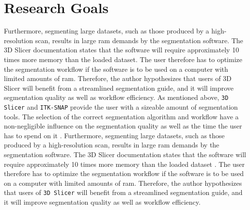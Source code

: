 \section{Research Goals}\label{s:introduction-researchgoals}
Furthermore, segmenting large datasets, such as those produced by a high-resolution \mct\space scan, results in large \acrfull{ram} demands by the segmentation software.
The 3D Slicer documentation states that the software will require approximately 10 times more memory than the loaded dataset.
The user therefore has to optimize the segmentation workflow if the software is to be used on a computer with limited amounts of \acrshort{ram}.
Therefore, the author hypothesizes that users of 3D Slicer will benefit from a streamlined segmentation guide, and it will improve segmentation quality as well as workflow efficiency.
As mentioned above, \texttt{3D Slicer} and \texttt{ITK-SNAP} provide the user with a sizeable amount of segmentation tools. The selection of the correct segmentation algorithm and workflow have a non-negligible influence on the segmentation quality as well as the time the user has to spend on it \cite{liuSAMMSegmentAny2023}.
Furthermore, segmenting large datasets, such as those produced by a high-resolution \mct\space scan, results in large \acrshort{ram} demands by the segmentation software\cite{smistadMedicalImageSegmentation2015}.
The 3D Slicer documentation states that the software will require approximately 10 times more memory than the loaded dataset \cite{slicercommunity3DSlicerImage2022,fedorov3DSlicerImage2012}.
The user therefore has to optimize the segmentation workflow if the software is to be used on a computer with limited amounts of \acrshort{ram}.
Therefore, the author hypothesizes that users of \texttt{3D Slicer} will benefit from a streamlined segmentation guide, and it will improve segmentation quality as well as workflow efficiency.

